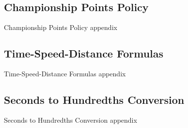 \documentclass[letterpaper,11pt]{article}
\begin{document}
\subsection{Championship Points Policy}

Championship Points Policy appendix

\subsection{Time-Speed-Distance Formulas}

Time-Speed-Distance Formulas appendix

\subsection{Seconds to Hundredths Conversion}

Seconds to Hundredths Conversion appendix

\clearpage

\hbox{}\clearpage\hbox{}\cleardoublepage
\end{document}
